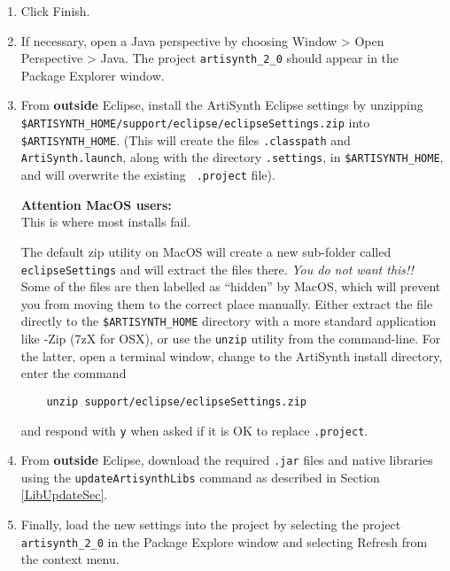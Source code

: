 \documentclass{article}
\begin{document}
\begin{enumerate}
\item Click {\sf Finish}.

\item If necessary, open a Java perspective by choosing {\sf Window > Open
  Perspective > Java}. The project {\tt artisynth\_2\_0} should appear in
  the {\sf Package Explorer} window.

\item From {\bf outside} Eclipse, install the ArtiSynth Eclipse
settings by unzipping {\tt
\$ARTISYNTH\_HOME/support/eclipse/eclipse\-Settings.zip} into {\tt
\$ARTISYNTH\_HOME}. (This will create the files {\tt .classpath} and
{\tt ArtiSynth.launch}, along with the directory {\tt .settings}, in
{\tt \$ARTISYNTH\_HOME}, and will overwrite the existing {\tt
.project} file).  

\begin{sideblock}
  {\bf Attention MacOS users:}\\[0.5em]
  This is where most installs fail.
  
  The default zip utility on MacOS will create a new sub-folder called 
  {\tt eclipseSettings} and will extract the files there.  \emph{You do not want this!!}
  Some of the files are then labelled as ``hidden'' by MacOS, which will
  prevent you from moving them to the correct place manually. 
  Either extract the file directly to the {\tt\$ARTISYNTH\_HOME} directory 
  with a more standard application like {-Zip} ({\sf 7zX} for OSX), 
  or use the {\tt unzip} utility from the command-line.  For the latter,
  open a terminal window, change to the ArtiSynth install directory,
  enter the command
  \begin{verbatim}
    unzip support/eclipse/eclipseSettings.zip
  \end{verbatim}
  and respond with {\tt y} when asked if it is OK to replace {\tt .project}.
\end{sideblock}

\item From {\bf outside} Eclipse, download the required
{\tt .jar} files and native libraries using the 
{\tt updateArtisynthLibs} command as described in Section
\ref{LibUpdateSec}.

\item Finally, load the new settings into the project by selecting the project
{\tt artisynth\_2\_0} in the {\sf Package Explore} window and selecting
{\sf Refresh} from the context menu.

\end{enumerate}
\end{document}
